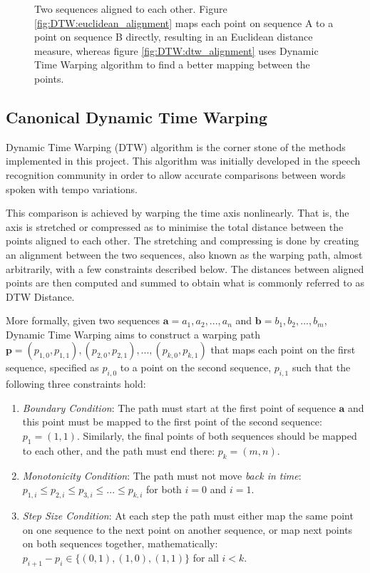 \documentclass[parskip]{cs4rep}
\begin{document}
\begin{figure}[b,t]
   \caption{Two sequences aligned to each other. Figure \ref{fig:DTW:euclidean_alignment} maps each point on sequence A to a point on sequence B directly, resulting in an Euclidean distance measure, whereas figure \ref{fig:DTW:dtw_alignment} uses Dynamic Time Warping algorithm to find a better mapping between the points.}
   \label{fig:DTW:alignments}
\end{figure}

\subsection{Canonical Dynamic Time Warping}

Dynamic Time Warping (DTW) algorithm is the corner stone of the methods implemented in this project. This algorithm was initially developed in the speech recognition community in order to allow accurate comparisons between words spoken with tempo variations. 

This comparison is achieved by warping the time axis nonlinearly. That is, the axis is stretched or compressed as to minimise the total distance between the points aligned to each other. The stretching and compressing is done by creating an alignment between the two sequences, also known as the warping path, almost arbitrarily, with a few constraints described below. The distances between aligned points are then computed and summed to obtain what is commonly referred to as DTW Distance.

More formally, given two sequences $\mathbf{a} = a_1, a_2, ..., a_n$ and $\mathbf{b} = b_1, b_2, ..., b_m$, Dynamic Time Warping aims to construct a warping path\\
$\mathbf{p} = { (p_{1,0}, p_{1,1}), (p_{2,0}, p_{2,1}), ..., (p_{k,0}, p_{k, 1}) }$ that maps each point on the first sequence, specified as $p_{i,0}$ to a point on the second sequence, $p_{i,1}$ such that the following three constraints hold:

\begin{enumerate}
\item \emph{Boundary Condition}: The path must start at the first point of sequence $\mathbf{a}$ and this point must be mapped to the first point of the second sequence: $p_1 = (1,1)$. Similarly, the final points of both sequences should be mapped to each other, and the path must end there: $p_k = (m, n).$ 
\item \emph{Monotonicity Condition}: The path must not move \emph{back in time}: 
    $p_{1,i} \le p_{2,i} \le p_{3,i} \le ... \le p_{k, i}$ for both $i=0$ and $i=1$.
\item \emph{Step Size Condition}: At each step the path must either map the same point on one sequence to the next point on another sequence, or map next points on both sequences together, mathematically:
    $p_{i+1} - p_{i} \in \{(0,1), (1,0), (1,1)\}$ for all $i < k$.
\end{enumerate}
\end{document}
